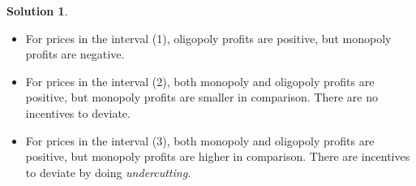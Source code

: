 \documentclass[a4paper, 11pt]{article}
\theoremstyle{definition}
\newtheorem{solution}{Solution}
\begin{document}
\begin{solution}
\begin{center}
\end{center}
\vspace*{-12pt}

\begin{itemize}
    \item For prices in the interval (1), oligopoly profits are positive, but monopoly profits are negative.
    \item For prices in the interval (2), both monopoly and oligopoly profits are positive, but monopoly profits are smaller in comparison. There are no incentives to deviate.
    \item For prices in the interval (3), both monopoly and oligopoly profits are positive, but monopoly profits are higher in comparison. There are  incentives to deviate by doing \textit{undercutting}.
\end{itemize}

\end{solution}
\end{document}
